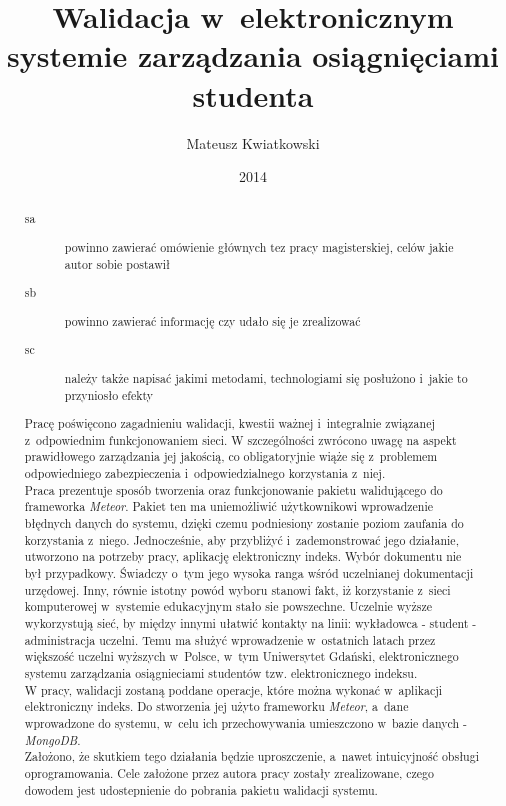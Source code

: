 \documentclass[brudnopis]{xmgr}
\author   {Mateusz Kwiatkowski}
\title    {Walidacja w~elektronicznym systemie zarządzania osiągnięciami studenta}
\date     {2014}
\begin{document}
\begin{abstract}

\begin{description}
\item[sa] \textcolor{sa}{powinno zawierać omówienie głównych
tez pracy magisterskiej, celów jakie autor sobie postawił}
\item[sb] \textcolor{sb}{powinno zawierać informację czy udało
  się je zrealizować}
\item[sc] \textcolor{sc}{należy także napisać jakimi metodami,
  technologiami się posłużono i~jakie to przyniosło efekty}
\end{description}

\indent \indent \textcolor{sa}{Pracę poświęcono zagadnieniu walidacji, kwestii ważnej i~integralnie związanej z~odpowiednim funkcjonowaniem sieci.
W szczególności zwrócono uwagę na aspekt prawidłowego zarządzania jej jakością, co obligatoryjnie wiąże się z~problemem
odpowiedniego zabezpieczenia i~odpowiedzialnego korzystania z~niej.}
\\
\indent \textcolor{sa}{Praca prezentuje sposób tworzenia oraz funkcjonowanie pakietu walidującego do frameworka \textit{Meteor}. Pakiet ten
ma uniemożliwić użytkownikowi wprowadzenie błędnych danych do systemu, dzięki czemu podniesiony zostanie poziom zaufania
do korzystania z~niego. Jednocześnie, aby przybliżyć i~zademonstrować jego działanie, utworzono na potrzeby pracy, aplikację elektroniczny indeks.
Wybór dokumentu nie był przypadkowy. Świadczy o~tym jego wysoka ranga wśród uczelnianej dokumentacji urzędowej. Inny, równie istotny powód
wyboru stanowi fakt, iż korzystanie z~sieci komputerowej w~systemie edukacyjnym stało sie powszechne. Uczelnie wyższe wykorzystują sieć, by
między innymi ułatwić kontakty na linii: wykładowca - student - administracja uczelni.  Temu ma służyć wprowadzenie w~ostatnich latach przez
większość uczelni wyższych w~Polsce, w~tym Uniwersytet Gdański, elektronicznego systemu zarządzania osiągnieciami studentów
tzw. elektronicznego indeksu.}
\\
\indent \textcolor{sc}{W pracy, walidacji zostaną poddane operacje, które można wykonać w~aplikacji elektroniczny indeks. Do stworzenia jej użyto frameworku \textit{Meteor}, a~dane wprowadzone do systemu, w~celu ich przechowywania umieszczono w~bazie danych - \textit{MongoDB}.}
\\
\indent \textcolor{sb}{Założono, że skutkiem tego działania będzie uproszczenie, a~nawet intuicyjność obsługi oprogramowania. Cele założone przez autora pracy zostały zrealizowane, czego dowodem jest udostepnienie do pobrania pakietu walidacji systemu.}

\end{abstract}
\end{document}
